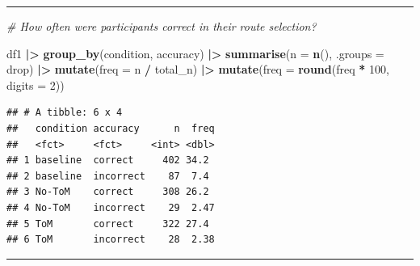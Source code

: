 \documentclass[
]{article}
\newenvironment{Shaded}{\begin{snugshade}}{\end{snugshade}}
\newcommand{\AttributeTok}[1]{\textcolor[rgb]{0.13,0.29,0.53}{#1}}
\newcommand{\CommentTok}[1]{\textcolor[rgb]{0.56,0.35,0.01}{\textit{#1}}}
\newcommand{\DecValTok}[1]{\textcolor[rgb]{0.00,0.00,0.81}{#1}}
\newcommand{\FunctionTok}[1]{\textcolor[rgb]{0.13,0.29,0.53}{\textbf{#1}}}
\newcommand{\NormalTok}[1]{#1}
\newcommand{\SpecialCharTok}[1]{\textcolor[rgb]{0.81,0.36,0.00}{\textbf{#1}}}
\newcommand{\StringTok}[1]{\textcolor[rgb]{0.31,0.60,0.02}{#1}}
\begin{document}
\begin{center}\rule{0.5\linewidth}{0.5pt}\end{center}

\begin{Shaded}
\begin{Highlighting}[]
\CommentTok{\# How often were participants correct in their route selection?}

\NormalTok{df1 }\SpecialCharTok{|\textgreater{}}
  \FunctionTok{group\_by}\NormalTok{(condition, }
\NormalTok{           accuracy) }\SpecialCharTok{|\textgreater{}}
  \FunctionTok{summarise}\NormalTok{(}\AttributeTok{n =} \FunctionTok{n}\NormalTok{(), }
            \AttributeTok{.groups =} \StringTok{\textquotesingle{}drop\textquotesingle{}}\NormalTok{) }\SpecialCharTok{|\textgreater{}} 
  \FunctionTok{mutate}\NormalTok{(}\AttributeTok{freq =}\NormalTok{ n }\SpecialCharTok{/}\NormalTok{ total\_n) }\SpecialCharTok{|\textgreater{}}
  \FunctionTok{mutate}\NormalTok{(}\AttributeTok{freq =} \FunctionTok{round}\NormalTok{(freq }\SpecialCharTok{*} \DecValTok{100}\NormalTok{, }\AttributeTok{digits =} \DecValTok{2}\NormalTok{))}
\end{Highlighting}
\end{Shaded}

\begin{verbatim}
## # A tibble: 6 x 4
##   condition accuracy      n  freq
##   <fct>     <fct>     <int> <dbl>
## 1 baseline  correct     402 34.2 
## 2 baseline  incorrect    87  7.4 
## 3 No-ToM    correct     308 26.2 
## 4 No-ToM    incorrect    29  2.47
## 5 ToM       correct     322 27.4 
## 6 ToM       incorrect    28  2.38
\end{verbatim}

\begin{center}\rule{0.5\linewidth}{0.5pt}\end{center}
\end{document}
